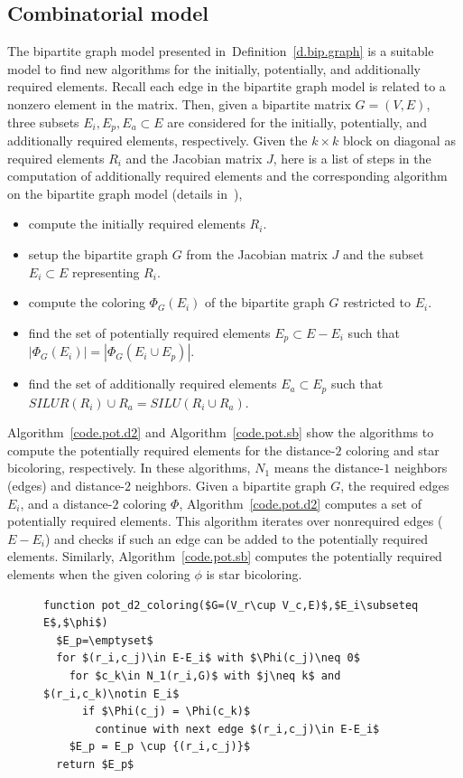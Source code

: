 \documentclass[12pt, twoside,a4paper,toc=bibliography]{scrbook}
\newcommand{\defref}[1]{Definition~\protect\ref{#1}}
\newcommand{\coderef}[1]{Algorithm~\protect\ref{#1}}
\begin{document}
\subsection{Combinatorial model}
\label{ss.comb.precond}
The bipartite graph model presented in~\defref{d.bip.graph} is
a suitable model to find new algorithms for the initially, potentially,
and additionally required elements. 
Recall each edge in the bipartite graph model is related to a nonzero element in 
the matrix.
Then, given a bipartite matrix $G = (V,E)$,
three subsets $E_i, E_p, E_a\subset E$
are considered for the initially, potentially,
and additionally required elements, respectively.
Given the $k\times k$ block on diagonal as required elements $R_i$ and the Jacobian matrix $J$,
here is a list of steps in the computation of additionally required elements
and the corresponding algorithm on the bipartite graph model
(details in~\cite{Lulfesmann2012Fap}),
\begin{itemize}
\item compute the initially required elements $R_i$.
\item setup the bipartite graph $G$ from the Jacobian matrix $J$ and the subset $E_i\subset E$ representing $R_i$.
\item compute the coloring $\Phi_{G}(E_i)$ of the bipartite graph $G$ restricted to $E_i$.
\item find the set of potentially required elements $E_p\subset E - E_i$ such that $|\Phi_{G}(E_i)| = |\Phi_{G}(E_i \cup E_p)|$.
\item find the set of additionally required elements $E_a\subset E_p$ such
that $SILUR(R_i) \cup R_a = SILU(R_i \cup R_a)$. 
\end{itemize}
\coderef{code.pot.d2} and \coderef{code.pot.sb} show the algorithms to compute the
potentially required elements for the distance-$2$ coloring and star bicoloring, respectively.
In these algorithms, $N_1$ means the distance-$1$ neighbors (edges) and 
distance-$2$ neighbors.
Given a bipartite graph $G$, the required edges $E_i$, and a distance-$2$ coloring $\Phi$,
\coderef{code.pot.d2} computes a set of potentially required elements. This algorithm
iterates over nonrequired edges ($E - E_i$) and checks if such an edge can be added to the 
potentially required elements. Similarly, \coderef{code.pot.sb} computes 
the potentially required elements when the given coloring $\phi$ is star bicoloring.
\begin{figure}
\begin{lstlisting}[caption=Find potentially required elements for
distance-$2$ coloring,label=code.pot.d2,mathescape]
function pot_d2_coloring($G=(V_r\cup V_c,E)$,$E_i\subseteq E$,$\phi$)
  $E_p=\emptyset$
  for $(r_i,c_j)\in E-E_i$ with $\Phi(c_j)\neq 0$
    for $c_k\in N_1(r_i,G)$ with $j\neq k$ and $(r_i,c_k)\notin E_i$
      if $\Phi(c_j) = \Phi(c_k)$
        continue with next edge $(r_i,c_j)\in E-E_i$
    $E_p = E_p \cup {(r_i,c_j)}$
  return $E_p$
\end{lstlisting}
\end{figure}
\end{document}
